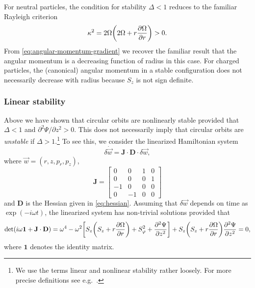 \documentclass[aps,pre,notitlepage,amsmath,amssymb,amsfonts,nobibnotes,nofootinbib,superscriptaddress]{revtex4-1}
\begin{document}
For neutral particles, the condition for stability $\Delta<1$ reduces to the
familiar Rayleigh criterion
\begin{equation}
  \label{eq:global-rayleigh-criterion}
  \kappa^2 = 2\Omega\left(2\Omega + r\pder{\Omega}{r}\right) > 0.
\end{equation}
From \cref{eq:angular-momentum-gradient} we recover the familiar result
\citep[e.g.][]{Chandrasekhar1961} that the angular momentum is a decreasing
function of radius in this case. For charged particles, the (canonical)
angular momentum in a stable configuration does not necessarily decrease with
radius because $S_z$ is not sign definite.

\subsubsection{Linear stability}

Above we have shown that circular orbits are nonlinearly stable provided that
$\Delta<1$ and $\partial^2\Psi/\partial{}z^2>0$. This does not necessarily
imply that circular orbits are \emph{unstable} if $\Delta>1$.\footnote{We use
  the terms linear and nonlinear stability rather loosely. For more precise
  definitions see e.g.\ \citet{Holm1985}.} To see this, we consider the
linearized Hamiltonian system
\begin{equation}
  \delta\dot{\vec{w}} = \mathbf{J}\cdot\mathbf{D}\cdot\delta\vec{w},
\end{equation}
where $\vec{w}=(r,z,p_r,p_z)$,
\begin{equation}
  \mathbf{J} = \begin{bmatrix}
     0 &  0 & 1 & 0 \\
     0 &  0 & 0 & 1 \\
    -1 &  0 & 0 & 0 \\
     0 & -1 & 0 & 0
  \end{bmatrix}
\end{equation}
and $\mathbf{D}$ is the Hessian given in \cref{eq:hessian}. Assuming that
$\delta\vec{w}$ depends on time as $\exp(-i\omega{}t)$, the linearized system
has non-trivial solutions provided that
\begin{equation}
  \label{eq:solubility-condition}
  \det(i\omega\mathbf{1} + \mathbf{J}\cdot\mathbf{D}) =
  \omega^4 - \omega^2\left[
    S_z\left(S_z + r\pder{\Omega}{r}\right) + S_\varphi^2 + \pdder{\Psi}{z}
  \right]
  + S_z\left(S_z + r\pder{\Omega}{r}\right)\pdder{\Psi}{z} = 0,
\end{equation}
where $\mathbf{1}$ denotes the identity matrix.
\end{document}
